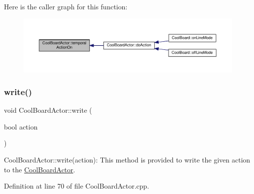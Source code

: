 Here is the caller graph for this function\+:\nopagebreak
\begin{figure}[H]
\begin{center}
\leavevmode
\includegraphics[width=350pt]{dc/d69/class_cool_board_actor_ada603785c203fdb0b41cc967d70bdc4d_icgraph}
\end{center}
\end{figure}
\mbox{\label{class_cool_board_actor_a958786ff01ea1056ee72c72d439f86da}} 
\subsubsection{\texorpdfstring{write()}{write()}}
{\footnotesize\ttfamily void Cool\+Board\+Actor\+::write (\begin{DoxyParamCaption}\item[{bool}]{action }\end{DoxyParamCaption})}

Cool\+Board\+Actor\+::write(action)\+: This method is provided to write the given action to the \hyperlink{class_cool_board_actor}{Cool\+Board\+Actor}. 

Definition at line 70 of file Cool\+Board\+Actor.\+cpp.


